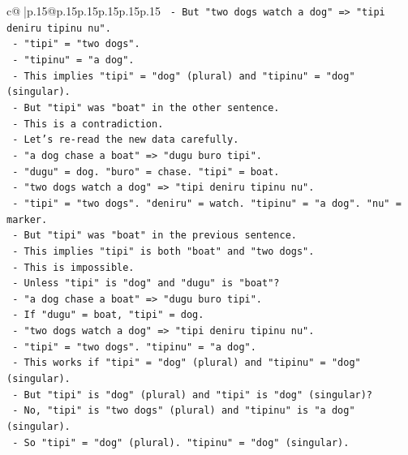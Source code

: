 \documentclass{article}
\begin{document}
{\begin{supertabular}{c@{$\;$}|p{.15\linewidth}@{}p{.15\linewidth}p{.15\linewidth}p{.15\linewidth}p{.15\linewidth}p{.15\linewidth}}
{{{\texttt{                 {-} But "two dogs watch a dog" => "tipi deniru tipinu nu".} \\
\texttt{                   {-} "tipi" = "two dogs".} \\
\texttt{                   {-} "tipinu" = "a dog".} \\
\texttt{                   {-} This implies "tipi" = "dog" (plural) and "tipinu" = "dog" (singular).} \\
\texttt{                   {-} But "tipi" was "boat" in the other sentence.} \\
\texttt{                   {-} This is a contradiction.} \\
\texttt{       {-} Let's re{-}read the new data carefully.} \\
\texttt{       {-} "a dog chase a boat" => "dugu buro tipi".} \\
\texttt{         {-} "dugu" = dog. "buro" = chase. "tipi" = boat.} \\
\texttt{       {-} "two dogs watch a dog" => "tipi deniru tipinu nu".} \\
\texttt{         {-} "tipi" = "two dogs". "deniru" = watch. "tipinu" = "a dog". "nu" = marker.} \\
\texttt{         {-} But "tipi" was "boat" in the previous sentence.} \\
\texttt{         {-} This implies "tipi" is both "boat" and "two dogs".} \\
\texttt{         {-} This is impossible.} \\
\texttt{       {-} Unless "tipi" is "dog" and "dugu" is "boat"?} \\
\texttt{         {-} "a dog chase a boat" => "dugu buro tipi".} \\
\texttt{           {-} If "dugu" = boat, "tipi" = dog.} \\
\texttt{           {-} "two dogs watch a dog" => "tipi deniru tipinu nu".} \\
\texttt{             {-} "tipi" = "two dogs". "tipinu" = "a dog".} \\
\texttt{             {-} This works if "tipi" = "dog" (plural) and "tipinu" = "dog" (singular).} \\
\texttt{             {-} But "tipi" is "dog" (plural) and "tipi" is "dog" (singular)?} \\
\texttt{             {-} No, "tipi" is "two dogs" (plural) and "tipinu" is "a dog" (singular).} \\
\texttt{             {-} So "tipi" = "dog" (plural). "tipinu" = "dog" (singular).} \\
}}}
\end{supertabular}}
\end{document}
